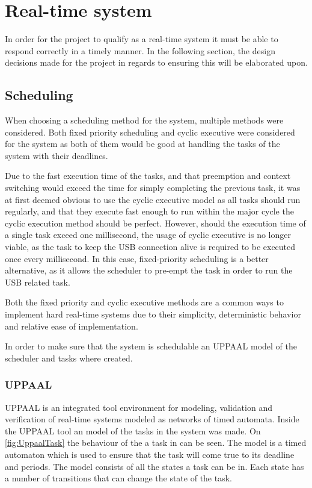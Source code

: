 \section{Real-time system}\label{Design:RTS} 
In order for the project to qualify as a real-time system it must be able to respond correctly in a timely manner.
In the following section, the design decisions made for the project in regards to ensuring this will be elaborated upon. 

\subsection{Scheduling}\label{Design:Scheduling}
When choosing a scheduling method for the system, multiple methods were considered. 
Both fixed priority scheduling and cyclic executive were considered for the system as both of them would be good at handling the tasks of the system with their deadlines.

Due to the fast execution time of the tasks, and that preemption and context switching would exceed the time for simply completing the previous task, it was at first deemed obvious to use the cyclic executive model as all tasks should run regularly, and that they execute fast enough to run within the major cycle the cyclic execution method should be perfect. 
However, should the execution time of a single task exceed one millisecond, the usage of cyclic executive is no longer viable, as the task to keep the USB connection alive is required to be executed once every millisecond.
In this case, fixed-priority scheduling is a better alternative, as it allows the scheduler to pre-empt the task in order to run the USB related task.

Both the fixed priority and cyclic executive methods are a common ways to implement hard real-time systems due to their simplicity, deterministic behavior and relative ease of implementation\cite{CyclicExecutionKimLarsen}.

In order to make sure that the system is schedulable an UPPAAL model of the scheduler and tasks where created. 

\subsubsection{UPPAAL}
UPPAAL is an integrated tool environment for modeling, validation and verification of real-time systems modeled as networks of timed automata\cite{UPPAALWebsite}. 
Inside the UPPAAL tool an model of the tasks in the system was made. 
On \autoref{fig:UppaalTask} the behaviour of the a task in can be seen. 
The model is a timed automaton which is used to ensure that the task will come true to its deadline and periods. 
The model consists of all the states a task can be in.
Each state has a number of transitions that can change the state of the task. 

